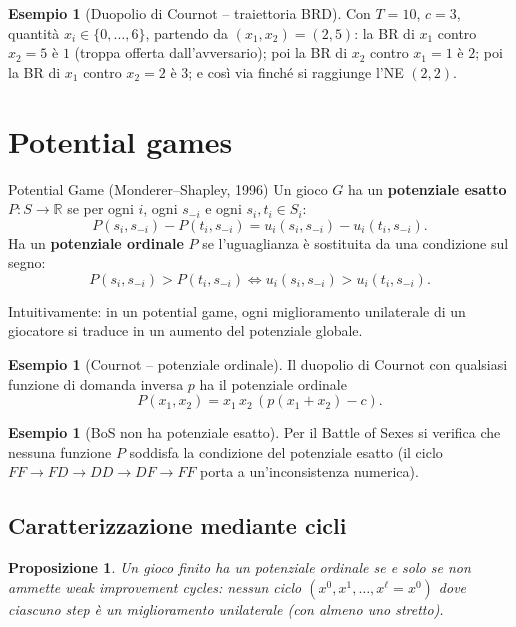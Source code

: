 \documentclass[12pt,a4paper,twoside]{book}
\theoremstyle{plain}
\newtheorem{proposition}[theorem]{Proposizione}
\theoremstyle{definition}
\newtheorem{example}[theorem]{Esempio}
\begin{document}
\begin{example}[Duopolio di Cournot -- traiettoria BRD]
Con $T=10$, $c=3$, quantità $x_i\in\{0,\dots,6\}$, partendo da $(x_1,x_2)=(2,5)$: la BR di $x_1$ contro $x_2=5$ è $1$ (troppa offerta dall'avversario); poi la BR di $x_2$ contro $x_1=1$ è $2$; poi la BR di $x_1$ contro $x_2=2$ è $3$; e così via finché si raggiunge l'NE $(2,2)$.
\end{example}

\section{Potential games}

\begin{defbox}{Potential Game (Monderer--Shapley, 1996)}
Un gioco $G$ ha un \textbf{potenziale esatto} $P:S\to\mathbb{R}$ se per ogni $i$, ogni $s_{-i}$ e ogni $s_i,t_i\in S_i$:
\[
  P(s_i,s_{-i}) - P(t_i,s_{-i}) = u_i(s_i,s_{-i}) - u_i(t_i,s_{-i}).
\]
Ha un \textbf{potenziale ordinale} $P$ se l'uguaglianza è sostituita da una condizione sul segno:
\[
  P(s_i,s_{-i}) > P(t_i,s_{-i}) \iff u_i(s_i,s_{-i}) > u_i(t_i,s_{-i}).
\]
\end{defbox}

Intuitivamente: in un potential game, ogni miglioramento unilaterale di un giocatore si traduce in un aumento del potenziale globale.

\begin{example}[Cournot -- potenziale ordinale]
Il duopolio di Cournot con qualsiasi funzione di domanda inversa $p$ ha il potenziale ordinale
\[
  P(x_1,x_2) = x_1\,x_2\,(p(x_1+x_2)-c).
\]
\end{example}

\begin{example}[BoS non ha potenziale esatto]
Per il Battle of Sexes si verifica che nessuna funzione $P$ soddisfa la condizione del potenziale esatto (il ciclo $FF\to FD\to DD\to DF\to FF$ porta a un'inconsistenza numerica).
\end{example}

\subsection{Caratterizzazione mediante cicli}

\begin{proposition}
Un gioco finito ha un potenziale ordinale se e solo se non ammette \emph{weak improvement cycles}: nessun ciclo $(x^0,x^1,\dots,x^\ell=x^0)$ dove ciascuno step è un miglioramento unilaterale (con almeno uno stretto).
\end{proposition}
\end{document}
